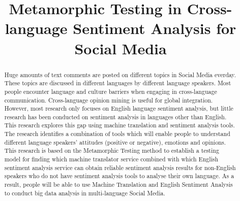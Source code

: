 \documentclass[conference]{IEEEtran}
\begin{document}
\title{\huge Metamorphic Testing in Cross-language Sentiment Analysis for Social Media}

\author{
\and
{}
\and
{}
\and
{}
}

\maketitle

\begin{abstract}
  Huge amounts of text comments are posted on different topics in Social
  Media everday. These topics are discussed in different languages by different language
  speakers. Most people encounter language and culture barriers when engaging in
  cross-language communication. Cross-language opinion
  mining is useful for global integration. However, most research only focuses on
  English language sentiment analysis, but little research has been conducted on
  sentiment analysis in languages other than English. This research explores
  this gap using machine translation and sentiment analysis tools. The research
  identifies a combination of tools which will enable people to understand different language speakers' attitudes (positive or negative),
  emotions and opinions. This research is  based on the Metamorphic Testing method to establish a
  testing model for finding which machine translator service combined with which
  English sentiment analysis service can obtain reliable sentiment analysis
  results for non-English speakers who do not have sentiment analysis tools to
  analyse their own language. As a result, people will be able to use Machine Translation
  and English Sentiment Analysis to conduct big data analysis in multi-language Social Media.
\end{abstract}
\end{document}
